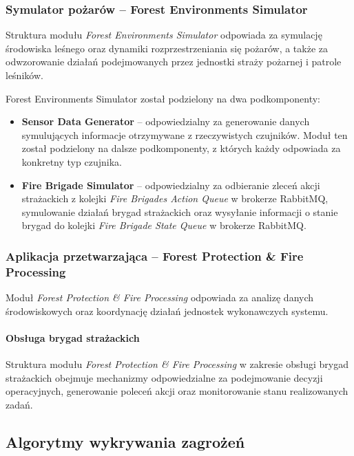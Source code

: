 \documentclass[11pt,a4paper]{article}
\begin{document}
\subsubsection{Symulator pożarów -- Forest Environments Simulator}

Struktura modułu \textit{Forest Environments Simulator} odpowiada za symulację środowiska leśnego oraz dynamiki rozprzestrzeniania się pożarów, a także za odwzorowanie działań podejmowanych przez jednostki straży pożarnej i patrole leśników.

Forest Environments Simulator został podzielony na dwa podkomponenty:

\begin{itemize}
    \item \textbf{Sensor Data Generator} – odpowiedzialny za generowanie danych symulujących informacje otrzymywane z rzeczywistych czujników. Moduł ten został podzielony na dalsze podkomponenty, z których każdy odpowiada za konkretny typ czujnika.
    \item \textbf{Fire Brigade Simulator} – odpowiedzialny za odbieranie zleceń akcji strażackich z kolejki \textit{Fire Brigades Action Queue} w brokerze RabbitMQ, symulowanie działań brygad strażackich oraz wysyłanie informacji o stanie brygad do kolejki \textit{Fire Brigade State Queue} w brokerze RabbitMQ.
\end{itemize}

\subsubsection{Aplikacja przetwarzająca -- Forest Protection \& Fire Processing}

Moduł \textit{Forest Protection \& Fire Processing} odpowiada za analizę danych środowiskowych oraz koordynację działań jednostek wykonawczych systemu.

\paragraph{Obsługa brygad strażackich}

Struktura modułu \textit{Forest Protection \& Fire Processing} w zakresie obsługi brygad strażackich obejmuje mechanizmy odpowiedzialne za podejmowanie decyzji operacyjnych, generowanie poleceń akcji oraz monitorowanie stanu realizowanych zadań.


\subsection{Algorytmy wykrywania zagrożeń}
\label{sec:detection}
\end{document}
